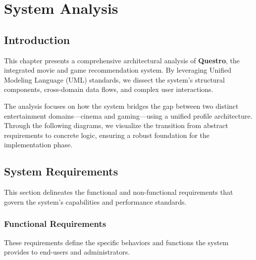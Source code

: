 \chapter{System Analysis}

\section{Introduction}
This chapter presents a comprehensive architectural analysis of \textbf{Questro}, the integrated movie and game recommendation system. By leveraging Unified Modeling Language (UML) standards, we dissect the system's structural components, cross-domain data flows, and complex user interactions.

The analysis focuses on how the system bridges the gap between two distinct entertainment domains—cinema and gaming—using a unified profile architecture. Through the following diagrams, we visualize the transition from abstract requirements to concrete logic, ensuring a robust foundation for the implementation phase.

\section{System Requirements}
This section delineates the functional and non-functional requirements that govern the system's capabilities and performance standards.

\subsection{Functional Requirements}
These requirements define the specific behaviors and functions the system provides to end-users and administrators.


